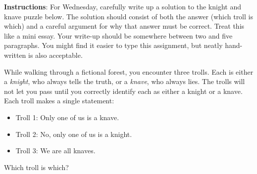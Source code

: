 \documentclass[11pt]{exam}
\begin{document}
\noindent \textbf{Instructions}: For Wednesday, carefully write up a solution to the knight and knave puzzle below.  The solution should consist of both the answer (which troll is which) and a careful argument for why that answer must be correct.  Treat this like a mini essay.  Your write-up should be somewhere between two and five paragraphs.  You might find it easier to type this assignment, but neatly hand-written is also acceptable.

\begin{questions}
  \question While walking through a fictional forest, you encounter three trolls.  Each is either a {\em knight}, who always tells the truth, or a {\em knave}, who always lies.  The trolls will not let you pass until you correctly identify each as either a knight or a knave.  Each troll makes a single statement:
  \begin{itemize}
   \item[] Troll 1: Only one of us is a knave.
   \item[] Troll 2: No, only one of us is a knight.
   \item[] Troll 3: We are all knaves.
  \end{itemize}
  Which troll is which?

\end{questions}
\end{document}
